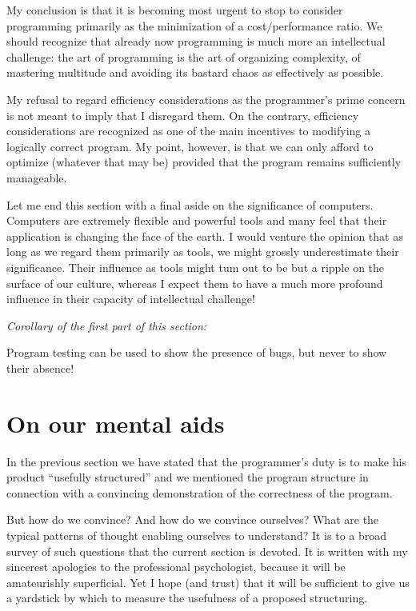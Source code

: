 My conclusion is that it is becoming most urgent to stop to consider programming primarily as the minimization of a cost$/$performance ratio. We
should recognize that already now programming is much more an intellectual challenge: the art of programming is the art of organizing complexity, of mastering multitude and avoiding its bastard chaos as effectively as possible.

My refusal to regard efficiency considerations as the programmer's prime concern is not meant to imply that I disregard them. On the contrary,
efficiency considerations are recognized as one of the main incentives to modifying a logically correct program. My point, however, is that we can
only afford to optimize (whatever that may be) provided that the program remains sufficiently manageable.

Let me end this section with a final aside on the significance of computers. Computers are extremely flexible and powerful tools and many feel that their application is changing the face of the earth. I would venture the opinion that as long as we regard them primarily as tools, we might grossly underestimate their significance. Their influence as tools might tum out to be but a ripple on the surface of our culture, whereas I expect them to have a much more profound influence in their capacity of intellectual challenge!
\smallskip

\noindent
\textit{Corollary of the first part of this section:}
\nopagebreak

\noindent
Program testing can be used to show the presence of bugs, but never to show their absence!

\section{On our mental aids}
\label{sec:out-mental-aids}

In the previous section we have stated that the programmer's duty is to make his product ``usefully structured'' and we mentioned the program structure in connection with a convincing demonstration of the correctness of the program.

But how do we convince? And how do we convince ourselves? What are the typical patterns of thought enabling ourselves to understand? It is to a broad survey of such questions that the current section is devoted. It is written with my sincerest apologies to the professional psychologist, because it will be amateurishly superficial. Yet I hope (and trust) that it will be sufficient to give us a yardstick by which to measure the usefulness of a proposed structuring.


